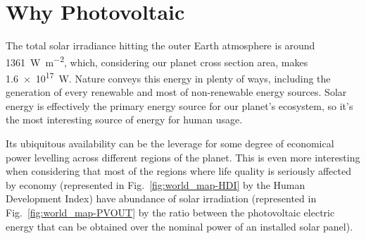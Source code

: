 \section{Why Photovoltaic}

	 The total solar irradiance hitting the outer Earth atmosphere is around \SI{1361}{\watt\per\square\metre},\cite{Kopp2011} which, considering our planet cross section area, makes \SI{1.6e17}{\watt}.
	Nature conveys this energy in plenty of ways, including the generation of every renewable and most of non-renewable energy sources.
	Solar energy is effectively the primary energy source for our planet's ecosystem, so it's the most interesting source of energy for human usage.

	 Its ubiquitous availability can be the leverage for some degree of economical power levelling across different regions of the planet.
	This is even more interesting when considering that most of the regions where life quality is seriously affected by economy (represented in Fig.~\ref{fig:world_map-HDI} by the Human Development Index) have abundance of solar irradiation (represented in Fig.~\ref{fig:world_map-PVOUT} by the ratio between the photovoltaic electric energy that can be obtained over the nominal power of an installed solar panel).

